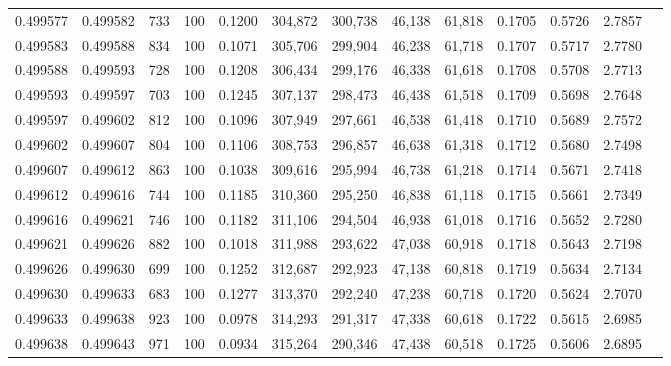 \begin{tabular}{rrrrrrrrrrrrr}
0.499577 & 0.499582 &   733 & 100 &                                     0.1200 & 304,872 & 300,738 &  46,138 &  61,818 & 0.1705 & 0.5726 & 2.7857 \\
0.499583 & 0.499588 &   834 & 100 &                                     0.1071 & 305,706 & 299,904 &  46,238 &  61,718 & 0.1707 & 0.5717 & 2.7780 \\
0.499588 & 0.499593 &   728 & 100 &                                     0.1208 & 306,434 & 299,176 &  46,338 &  61,618 & 0.1708 & 0.5708 & 2.7713 \\
0.499593 & 0.499597 &   703 & 100 &                                     0.1245 & 307,137 & 298,473 &  46,438 &  61,518 & 0.1709 & 0.5698 & 2.7648 \\
0.499597 & 0.499602 &   812 & 100 &                                     0.1096 & 307,949 & 297,661 &  46,538 &  61,418 & 0.1710 & 0.5689 & 2.7572 \\
0.499602 & 0.499607 &   804 & 100 &                                     0.1106 & 308,753 & 296,857 &  46,638 &  61,318 & 0.1712 & 0.5680 & 2.7498 \\
0.499607 & 0.499612 &   863 & 100 &                                     0.1038 & 309,616 & 295,994 &  46,738 &  61,218 & 0.1714 & 0.5671 & 2.7418 \\
0.499612 & 0.499616 &   744 & 100 &                                     0.1185 & 310,360 & 295,250 &  46,838 &  61,118 & 0.1715 & 0.5661 & 2.7349 \\
0.499616 & 0.499621 &   746 & 100 &                                     0.1182 & 311,106 & 294,504 &  46,938 &  61,018 & 0.1716 & 0.5652 & 2.7280 \\
0.499621 & 0.499626 &   882 & 100 &                                     0.1018 & 311,988 & 293,622 &  47,038 &  60,918 & 0.1718 & 0.5643 & 2.7198 \\
0.499626 & 0.499630 &   699 & 100 &                                     0.1252 & 312,687 & 292,923 &  47,138 &  60,818 & 0.1719 & 0.5634 & 2.7134 \\
0.499630 & 0.499633 &   683 & 100 &                                     0.1277 & 313,370 & 292,240 &  47,238 &  60,718 & 0.1720 & 0.5624 & 2.7070 \\
0.499633 & 0.499638 &   923 & 100 &                                     0.0978 & 314,293 & 291,317 &  47,338 &  60,618 & 0.1722 & 0.5615 & 2.6985 \\
0.499638 & 0.499643 &   971 & 100 &                                     0.0934 & 315,264 & 290,346 &  47,438 &  60,518 & 0.1725 & 0.5606 & 2.6895 \\

\end{tabular}
